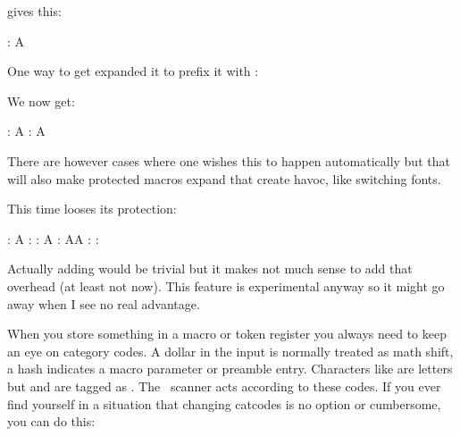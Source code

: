 \startbuffer
           \def\TestA{A}
\protected {}
          \edef\TestC{\TestA\TestB}
\stopbuffer

\typebuffer[option=TEX] \getbuffer

gives this:

\startlines
\type{\TestC} : {\tttf \meaningless\TestC}
\stoplines

One way to get \type {\TestB} expanded it to prefix it with \type {\expand}:

\startbuffer
           \def\TestA{A}
\protected {}
          \edef\TestC{\TestA\TestB}
          \edef\TestD{\TestA\expand\TestB}
\stopbuffer

\typebuffer[option=TEX] \getbuffer

We now get:

\startlines
\type{\TestC} : {\tttf \meaningless\TestC}
\type{\TestD} : {\tttf \meaningless\TestD}
\stoplines

There are however cases where one wishes this to happen automatically but that
will also make protected macros expand that create havoc, like switching fonts.

\startbuffer
               \def\TestA{A}
\protected     {}
\semiprotected \def\TestC{C}
              \edef\TestD{\TestA\TestB\TestC}
              \edef\TestE{\normalexpanded{\TestA\TestB\TestC}}
              \edef\TestF{\semiexpanded  {\TestA\TestB\TestC}}
\stopbuffer

\typebuffer[option=TEX] \getbuffer

This time \type {\TestC} looses its protection:

\startlines
\type{\TestA} : {\tttf \meaningless\TestA}
\type{\TestB} : {\tttf \meaningless\TestB}
\type{\TestC} : {\tttf \meaningless\TestC}
\type{\TestD} : {\tttf \meaningless\TestD}
\type{\TestE} : {\tttf \meaningless\TestE}
\type{\TestF} : {\tttf \meaningless\TestF}
\stoplines

Actually adding \type {\fullyexpanded} would be trivial but it makes not much
sense to add that overhead (at least not now). This feature is experimental
anyway so it might go away when I see no real advantage.

When you store something in a macro or token register you always need to keep an
eye on category codes. A dollar in the input is normally treated as math shift, a
hash indicates a macro parameter or preamble entry. Characters like 
are letters but \quote {[} and \quote {]} are tagged as . The \TEX\
scanner acts according to these codes. If you ever find yourself in a situation
that changing catcodes is no option or cumbersome, you can do this:

